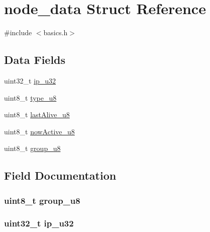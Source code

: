 \hypertarget{structnode__data}{}\section{node\+\_\+data Struct Reference}
\label{structnode__data}


{\ttfamily \#include $<$basics.\+h$>$}

\subsection*{Data Fields}
\begin{DoxyCompactItemize}
\item 
uint32\+\_\+t \hyperlink{structnode__data_a69feedc372be27a0a637010a9bfab704}{ip\+\_\+u32}
\item 
uint8\+\_\+t \hyperlink{structnode__data_a677fd4351d9bd7671761acae74011cd5}{type\+\_\+u8}
\item 
uint8\+\_\+t \hyperlink{structnode__data_a06224df76b4c5912c002b5828a30e0b5}{last\+Alive\+\_\+u8}
\item 
uint8\+\_\+t \hyperlink{structnode__data_aa73920c33d0191354e36d8e8bd73dd97}{now\+Active\+\_\+u8}
\item 
uint8\+\_\+t \hyperlink{structnode__data_a66cffb437c58d938eb4f234eb3d378c0}{group\+\_\+u8}
\end{DoxyCompactItemize}


\subsection{Field Documentation}
\hypertarget{structnode__data_a66cffb437c58d938eb4f234eb3d378c0}{}
\subsubsection[{group\+\_\+u8}]{\setlength{\rightskip}{0pt plus 5cm}uint8\+\_\+t group\+\_\+u8}\label{structnode__data_a66cffb437c58d938eb4f234eb3d378c0}
\hypertarget{structnode__data_a69feedc372be27a0a637010a9bfab704}{}
\subsubsection[{ip\+\_\+u32}]{\setlength{\rightskip}{0pt plus 5cm}uint32\+\_\+t ip\+\_\+u32}\label{structnode__data_a69feedc372be27a0a637010a9bfab704}
\hypertarget{structnode__data_a06224df76b4c5912c002b5828a30e0b5}{}
